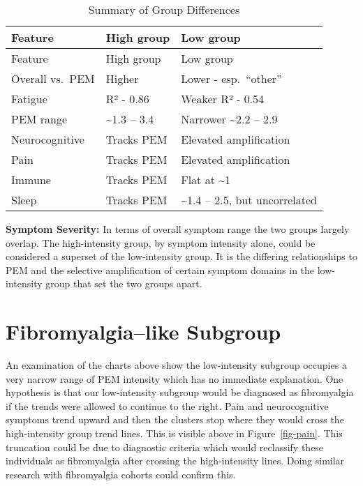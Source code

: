 \documentclass[
  letterpaper,
  DIV=11,
  numbers=noendperiod]{scrartcl}
\begin{document}
\begin{longtable}[]{@{}lll@{}}
\caption{Summary of Group Differences}\label{tbl-t1}\tabularnewline
\toprule\noalign{}
Feature & High group & Low group \\
\midrule\noalign{}
\endfirsthead
\toprule\noalign{}
Feature & High group & Low group \\
\midrule\noalign{}
\endhead
\bottomrule\noalign{}
\endlastfoot
Overall vs.~PEM & Higher & Lower - esp.~``other'' \\
Fatigue & R² - 0.86 & Weaker R² - 0.54 \\
PEM range & \textasciitilde1.3 -- 3.4 & Narrower \textasciitilde2.2 --
2.9 \\
Neurocognitive & Tracks PEM & Elevated amplification \\
Pain & Tracks PEM & Elevated amplification \\
Immune & Tracks PEM & Flat at \textasciitilde1 \\
Sleep & Tracks PEM & \textasciitilde1.4 -- 2.5, but uncorrelated \\
\end{longtable}

\bigskip

\textbf{Symptom Severity:} In terms of overall symptom range the two
groups largely overlap. The high-intensity group, by symptom intensity
alone, could be considered a superset of the low-intensity group. It is
the differing relationships to PEM and the selective amplification of
certain symptom domains in the low-intensity group that set the two
groups apart.

\section{Fibromyalgia--like Subgroup}\label{fibromyalgialike-subgroup}

An examination of the charts above show the low-intensity subgroup
occupies a very narrow range of PEM intensity which has no immediate
explanation. One hypothesis is that our low-intensity subgroup would be
diagnosed as fibromyalgia if the trends were allowed to continue to the
right. Pain and neurocognitive symptoms trend upward and then the
clusters stop where they would cross the high-intensity group trend
lines. This is visible above in Figure~\ref{fig-pain}. This truncation
could be due to diagnostic criteria which would reclassify these
individuals as fibromyalgia after crossing the high-intensity lines.
Doing similar research with fibromyalgia cohorts could confirm this.
\end{document}
